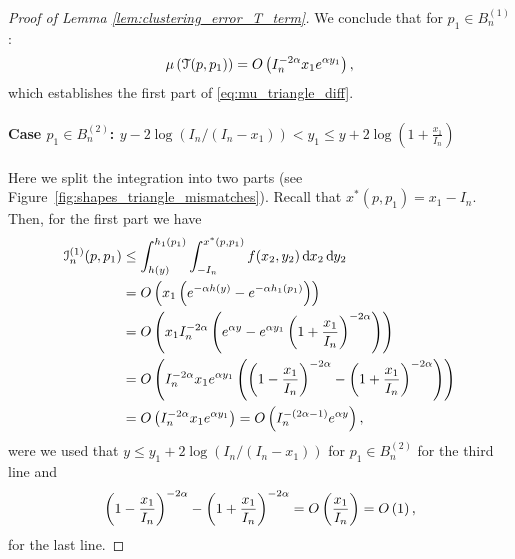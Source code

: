 \begin{proof}[Proof of Lemma \ref{lem:clustering_error_T_term}]
We conclude that for $p_1 \in B_n^{(1)}$:
\[
	\mu\left(\mathcal{T}(p,p_1)\right) = O\left(I_n^{-2\alpha} x_1 e^{\alpha y_1}\right),
\]
which establishes the first part of \eqref{eq:mu_triangle_diff}.

\paragraph{Case $p_1 \in B_n^{(2)}$: $y - 2\log(I_n/(I_n-x_1)) < y_1 \le y + 2 \log\left(1 + \frac{x_1}{I_n}\right)$}

Here we split the integration into two parts (see Figure~\ref{fig:shapes_triangle_mismatches}). Recall that $x^\ast(p,p_1) = x_1 - I_n$. Then, for the first part we have
\begin{align*}
	\mathcal{I}_n^{(1)}(p,p_1) &\le \int_{h(y)}^{h_1(p_1)} \int_{-I_n}^{x^\ast(p,p_1)} f(x_2, y_2) 
		\operatorname{\mathrm{d}\hspace{-2pt}} x_2 \operatorname{\mathrm{d}\hspace{-2pt}} y_2\\
	&= O\left(x_1 \left(e^{-\alpha h(y)} - e^{-\alpha h_1(p_1)}\right)\right)\\
	&= O\left(x_1 I_n^{-2\alpha}\left(e^{\alpha y} - e^{\alpha y_1}\left(1 + \frac{x_1}{I_n}\right)^{-2\alpha}\right)\right)\\
	&= O\left(I_n^{-2\alpha} x_1 e^{\alpha y_1}\left(\left(1 - \frac{x_1}{I_n}\right)^{-2\alpha} 
		- \left(1 + \frac{x_1}{I_n}\right)^{-2\alpha}\right)\right)\\
	&= O\left(I_n^{-2\alpha} x_1 e^{\alpha y_1}\right) = O\left(I_n^{-(2\alpha - 1)} e^{\alpha y}\right), 
\end{align*}
were we used that $y \le y_1 + 2\log(I_n/(I_n-x_1))$ for $p_1 \in B_n^{(2)}$ for the third line and 
\[
	\left(1 - \frac{x_1}{I_n}\right)^{-2\alpha} - \left(1 + \frac{x_1}{I_n}\right)^{-2\alpha}
	= O\left(\frac{x_1}{I_n}\right) = O\left(1\right),
\]
for the last line.


\end{proof}

